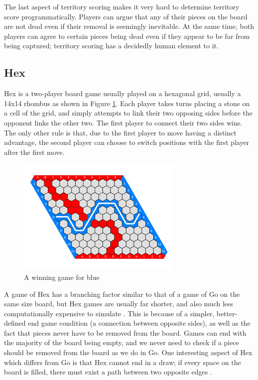 The last aspect of territory scoring makes it very hard to determine territory score programmatically.  Players can argue that any of their pieces on the board are not dead even if their removal is seemingly inevitable.  At the same time, both players can agree to certain pieces being dead even if they appear to be far from being captured; territory scoring has a decidedly human element to it.

\subsection{Hex}
Hex is a two-player board game usually played on a hexagonal grid, usually a 14x14 rhombus as shown in Figure \ref{ref:hex}.  Each player takes turns placing a stone on a cell of the grid, and simply attempts to link their two opposing sides before the opponent links the other two.  The first player to connect their two sides wins.  The only other rule is that, due to the first player to move having a distinct advantage, the second player can choose to switch positions with the first player after the first move.

\begin{figure}[h]
\centering
\includegraphics[scale=0.4]{images/hex.jpg}
\caption{A winning game for blue \cite{hexwiki}}
\label{ref:hex}
\end{figure}

A game of Hex has a branching factor similar to that of a game of Go on the same size board, but Hex games are usually far shorter, and also much less computationally expensive to simulate \cite{goscore}.  This is because of a simpler, better-defined end game condition (a connection between opposite sides), as well as the fact that pieces never have to be removed from the board.  Games can end with the majority of the board being empty, and we never need to check if a piece should be removed from the board as we do in Go.  One interesting aspect of Hex which differs from Go is that Hex cannot end in a draw; if every space on the board is filled, there must exist a path between two opposite edges \cite{goscore}.

